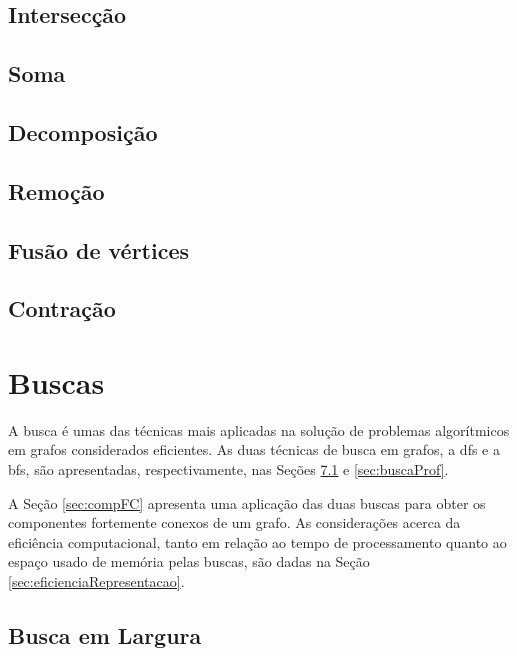 \documentclass[
12pt,
a4paper,
semrecuonosumario,
sumario = abnt-6027-2012]{report}
\begin{document}
	\section{Intersecção}\label{sec:interseccao}

	\section{Soma}\label{sec:soma}


	\section{Decomposição}\label{sec:decomposicao}

	\section{Remoção}\label{sec:remocao}


	\section{Fusão de vértices}\label{sec:fusao}

	\section{Contração}\label{sec:contracao}


	\chapter{Buscas}\label{cap:buscas}

	A busca é umas das técnicas mais aplicadas na solução de problemas algorítmicos em grafos considerados eficientes. As duas técnicas de busca em grafos, a {dfs} e a {bfs}, são apresentadas, respectivamente, nas Seções \ref{sec:buscaLarg} e \ref{sec:buscaProf}.

	A Seção \ref{sec:compFC} apresenta uma aplicação das duas buscas para obter os componentes fortemente conexos de um grafo. As considerações acerca da eficiência computacional, tanto em relação ao tempo de processamento quanto ao espaço usado de memória pelas buscas, são dadas na Seção \ref{sec:eficienciaRepresentacao}.

	\section{Busca em Largura}\label{sec:buscaLarg}
\end{document}
